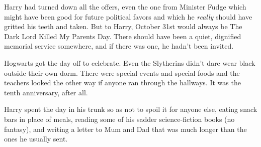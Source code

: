 Harry had turned down all the offers, even the one from Minister Fudge which might have been good for future political favors and which he \emph{really} should have gritted his teeth and taken. But to Harry, October 31st would always be The Dark Lord Killed My Parents Day. There should have been a quiet, dignified memorial service somewhere, and if there was one, he hadn't been invited.

Hogwarts got the day off to celebrate. Even the Slytherins didn't dare wear black outside their own dorm. There were special events and special foods and the teachers looked the other way if anyone ran through the hallways. It was the tenth anniversary, after all.

Harry spent the day in his trunk so as not to spoil it for anyone else, eating snack bars in place of meals, reading some of his sadder science-fiction books (no fantasy), and writing a letter to Mum and Dad that was much longer than the ones he usually sent.

